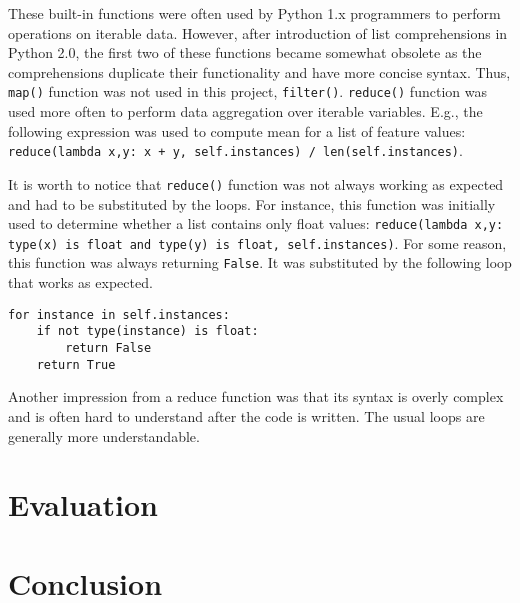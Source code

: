 \documentclass{llncs}
\begin{document}
These built-in functions were often used by Python 1.x programmers to perform operations on iterable data. However, after introduction of list comprehensions in Python 2.0, the first two of these functions became somewhat obsolete as the comprehensions duplicate their functionality and have more concise syntax. Thus, \lstinline{map()} function was not used in this project, \lstinline{filter()}. \lstinline{reduce()} function was used more often to perform data aggregation over iterable variables. E.g., the following expression was used to compute mean for a list of feature values: \lstinline{reduce(lambda x,y: x + y, self.instances) / len(self.instances)}. 

It is worth to notice that \lstinline{reduce()} function was not always working as expected and had to be substituted by the loops. For instance, this function was initially used to determine whether a list contains only float values: \lstinline{reduce(lambda x,y: type(x) is float and type(y) is float, self.instances)}. For some reason, this function was always returning \lstinline{False}. It was substituted by the following loop that works as expected.

\begin{lstlisting}[caption = A loop determining whether the list contains only floats.]
for instance in self.instances:
    if not type(instance) is float:
        return False
    return True
\end{lstlisting}

Another impression from a reduce function was that its syntax is overly complex and is often hard to understand after the code is written. The usual loops are generally more understandable.

\section{Evaluation}

\section{Conclusion}
\end{document}
